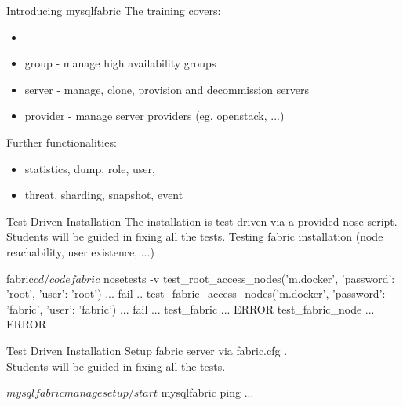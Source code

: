 \documentclass{beamer}[10]
\begin{document}

\begin{pyframe}{Introducing mysqlfabric}
The training covers:
\begin{itemize}
\item {}
\item group - manage high availability groups
\item server - manage, clone, provision and decommission servers
\item provider - manage server providers (eg. openstack, ...)
\end{itemize}
Further functionalities:
\begin{itemize}
\item statistics, dump, role, user,
\item threat, sharding, snapshot, event
\end{itemize}
\end{pyframe}


\begin{pyframe}{Test Driven Installation}
The installation is test-driven via a provided nose script.
Students will be guided in fixing all the tests.
Testing fabric installation (node reachability, user existence, ...)

\begin{bashcode}
fabric$ cd /code
fabric$ nosetests -v
test_root_access_nodes('m.docker', {'password': 'root', 'user': 'root'}) ... fail
..
test_fabric_access_nodes('m.docker', {'password': 'fabric', 'user': 'fabric'}) ... fail
...
test_fabric ... ERROR
test_fabric_node ... ERROR
\end{bashcode}
\end{pyframe}



\begin{pyframe}{Test Driven Installation}
Setup fabric server via fabric.cfg . \\
Students will be guided in fixing all the tests.

\begin{bashcode}
$ mysqlfabric manage setup / start
$ mysqlfabric ping ...
\end{bashcode}
\end{pyframe}
\end{document}
